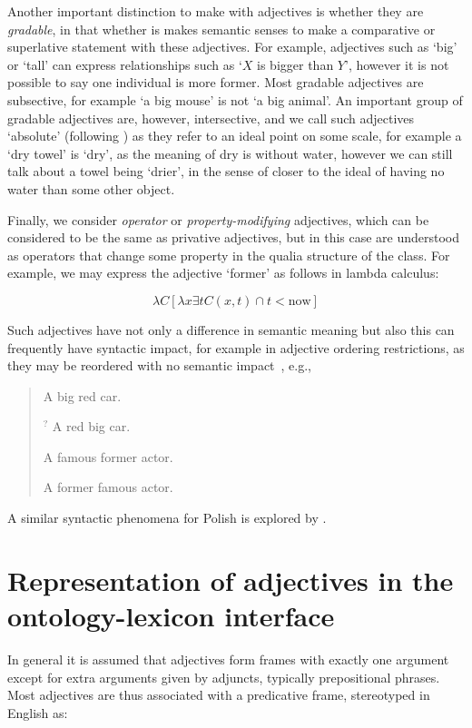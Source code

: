 \documentclass[11pt]{article}
\begin{document}
Another important distinction to make with adjectives is whether they are \emph{gradable}, in that whether is makes semantic senses to make a comparative or superlative statement with these adjectives. For example, adjectives such as `big' or `tall' can express relationships such as `$X$ is bigger than $Y$', however it is not possible to say one individual is more former. Most gradable adjectives are subsective, for example `a big mouse' is not `a big animal'. An important group of gradable adjectives are, however, intersective, and we call such adjectives `absolute' (following \cite{rusiecki1985adjectives}) as they refer to an ideal point on some scale, for example a `dry towel' is `dry', as the meaning of dry is without water, however we can still talk about a towel being `drier', in the sense of closer to the ideal of having no water than some other object.

Finally, we consider \emph{operator} or \emph{property-modifying} adjectives, which can be considered to be the same as privative adjectives, but in this case are understood as operators that change some property in the qualia structure of the class. For example, we may express the adjective `former' as follows in lambda calculus\cite{partee2003there}:

$$\lambda C [\lambda x \exists t C(x,t) \cap t < \mathrm{now}]$$

Such adjectives have not only a difference in semantic meaning but also this can frequently have syntactic impact, for example in adjective ordering restrictions, as they may be reordered with no semantic impact~\cite{teodorescu2006adjective}, e.g.,

\begin{quote}
A big red car.

$^?$ A red big car.

A famous former actor.

A former famous actor.
\end{quote}

A similar syntactic phenomena for Polish is explored by \cite{partee2003there}.

\section{Representation of adjectives in the ontology-lexicon interface}

In general it is assumed that adjectives form frames with exactly one argument except for extra arguments given by adjuncts, typically prepositional phrases. Most adjectives are thus associated with a predicative frame, stereotyped in English as:
\end{document}
